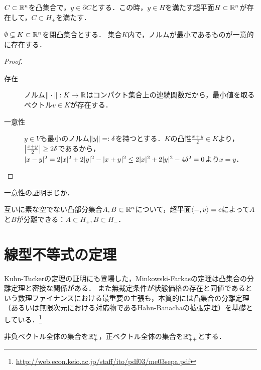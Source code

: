 \documentclass[uplatex,dvipdfmx]{jsreport}
\begin{document}
\begin{proposition}
    $C\subset\mathbb{R}^n$を凸集合で，$y\in\partial C$とする．この時，$y\in H$を満たす超平面$H\subset\mathbb{R}^n$が存在して，$C\subset H_+$を満たす．
\end{proposition}

\begin{lemma}
    $\emptyset\subsetneq K\subset\mathbb{R}^n$を閉凸集合とする．
    集合$K$内で，ノルムが最小であるものが一意的に存在する．
\end{lemma}
\begin{proof}\mbox{}
    \begin{description}
        \item[存在] ノルム$\|\cdot\|:K\to\mathbb{R}$はコンパクト集合上の連続関数だから，最小値を取るベクトル$v\in K$が存在する．
        \item[一意性] $y\in V$も最小のノルム$\|y\|=:\delta$を持つとする．$K$の凸性$\frac{x+y}{2}\in K$より，$\left|\frac{x+y}{2}\right|\ge 2\delta$であるから，$\lvert x-y\rvert^2=2\lvert x\rvert^2+2\lvert y\rvert^2-\lvert x+y\rvert^2\le 2\lvert x\rvert^2+2\lvert y\rvert^2-4\delta^2=0$より$x=y$．
    \end{description}
\end{proof}
\begin{remarks}
    一意性の証明まじか．
\end{remarks}

\begin{theorem}[分離定理]
    互いに素な空でない凸部分集合$A,B\subset\mathbb{R}^n$について，超平面$\langle-,v\rangle=c$によって$A$と$B$が分離できる：$A\subset H_+,B\subset H_-$．
\end{theorem}

\section{線型不等式の定理}

\begin{tcolorbox}[colframe=ForestGreen, colback=ForestGreen!10!white,breakable,colbacktitle=ForestGreen!40!white,coltitle=black,fonttitle=\bfseries\sffamily,
title=]
    Kuhn-Tuckerの定理の証明にも登場した，Minkowski-Farkasの定理は凸集合の分離定理と密接な関係がある．
    また無裁定条件が状態価格の存在と同値であるという数理ファイナンスにおける最重要の主張も，本質的には凸集合の分離定理（あるいは無限次元における対応物であるHahn-Banachaの拡張定理）を基礎としている．\footnote{\url{http://web.econ.keio.ac.jp/staff/ito/pdf03/me03sepa.pdf}}
\end{tcolorbox}

\begin{notation}
    非負ベクトル全体の集合を$\mathbb{R}^n_+$，正ベクトル全体の集合を$\mathbb{R}^n_{++}$とする．
\end{notation}
\end{document}
